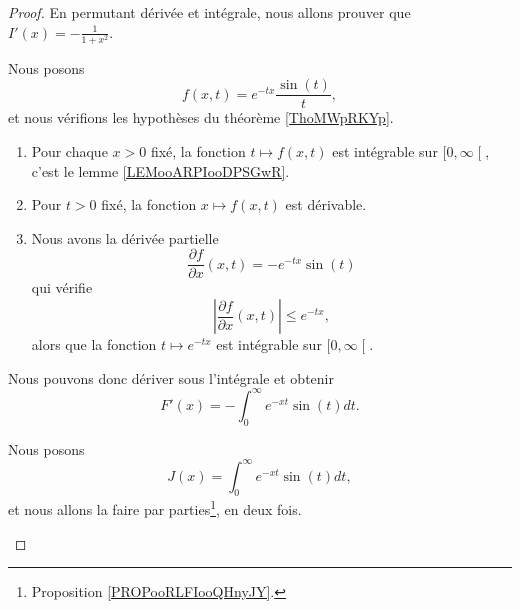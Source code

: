 \begin{proof}
	En permutant dérivée et intégrale, nous allons prouver que \( I'(x)=-\frac{1}{ 1+x^2 }\).

	\begin{subproof}
		\item[Permuter]
		Nous posons
		\begin{equation}
			f(x,t)= e^{-tx}\frac{ \sin(t) }{ t },
		\end{equation}
		et nous vérifions les hypothèses du théorème \ref{ThoMWpRKYp}.

		\begin{enumerate}
			\item
			      Pour chaque \( x>0\) fixé, la fonction \( t\mapsto f(x,t)\) est intégrable sur \( \mathopen[ 0 , \infty \mathclose[\), c'est le lemme \ref{LEMooARPIooDPSGwR}.
			\item
			      Pour \( t>0\) fixé, la fonction \( x\mapsto f(x,t)\) est dérivable.
			\item
			      Nous avons la dérivée partielle
			      \begin{equation}
				      \frac{ \partial f }{ \partial x }(x,t)=- e^{-tx}\sin(t)
			      \end{equation}
			      qui vérifie
			      \begin{equation}
				      | \frac{ \partial f }{ \partial x }(x,t) |\leq  e^{-tx},
			      \end{equation}
			      alors que la fonction \( t\mapsto  e^{-tx}\) est intégrable sur \( \mathopen[ 0 , \infty \mathclose[\).
		\end{enumerate}
		Nous pouvons donc dériver sous l'intégrale et obtenir
		\begin{equation}
			F'(x)=-\int_0^{\infty} e^{-xt}\sin(t)dt.
		\end{equation}
		\item[Quelques intégrations par partie]
		Nous posons
		\begin{equation}
			J(x)=\int_0^{\infty} e^{-xt}\sin(t)dt,
		\end{equation}
		et nous allons la faire par parties\footnote{Proposition \ref{PROPooRLFIooQHnyJY}.}, en deux fois.


\end{subproof}
\end{proof}
